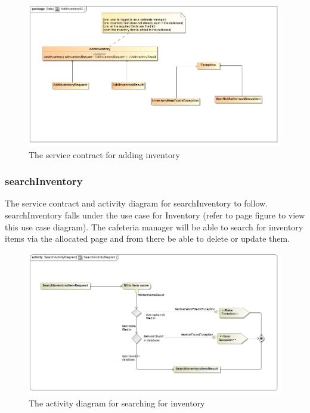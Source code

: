 \documentclass[a4paper,12pt]{report}
\begin{document}
\begin{figure}[H]
	\centering
	\includegraphics[width=1.0\textwidth]{../images/AddInventorySC.jpg}
	\caption{The service contract for adding inventory}
\end{figure}

\subsubsection{searchInventory}
The service contract and activity diagram for searchInventory to follow. searchInventory falls under the use case for Inventory (refer to page   figure   to view this use case diagram). The cafeteria manager will be able to search for inventory items via the allocated page and from there be able to delete or update them.
\begin{figure}[H]
  \centering
    \includegraphics[width=1.0\textwidth]{../images/SearchActivityDiagram.jpg}
    \caption{The activity diagram for searching for inventory} 
\end{figure}
\end{document}
